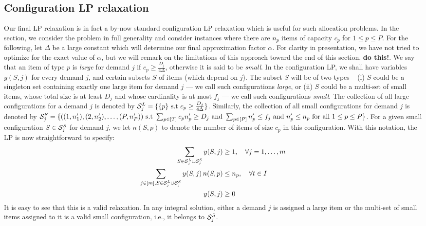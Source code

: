 \subsection{Configuration LP relaxation}
Our final LP relaxation is in fact a by-now standard configuration LP relaxation which is useful for such allocation problems. In the section, we consider the problem in full generality and consider instances where there are $n_p$ items of capacity $c_p$ for $1 \leq p \leq P$. For the following, let $\Delta$ be a large constant which will determine our final approximation factor $\alpha$. For clarity in presentation, we have not tried to optimize for the exact value of $\alpha$, but we will remark on the limitations of this approach toward the end of this section. {\bf do this!}. We say that an item of type $p$ is {\em large} for demand $j$ if $c_p \geq \frac{D_j}{4\Delta}$, otherwise it is said to be \emph{small}. In the configuration LP, we shall have variables $y(S,j)$ for every demand $j$, and certain subsets $S$ of items (which depend on $j$).
The subset $S$ will be of two types -- (i) $S$ could be a singleton set containing exactly one large item for demand $j$ --- we call such configurations {\em large}, or (ii) $S$ could be a multi-set of small items, whose total size is at least $D_j$ and whose cardinality is at most $f_j$ --- we call such configurations {\em small}. The collection of all large configurations for a demand $j$ is denoted by ${\cal S}^L_j = \{ \{p\} \text{ s.t } c_p \geq \frac{D_j}{4 \Delta}  \}$. Similarly, the collection of all small configurations for demand $j$ is denoted by ${\cal S}^S_j = \{ ((1,n'_1), (2,n'_2), \ldots, (P,n'_P)) \text{ s.t } \sum_{p \in [T]} c_p n'_p \geq D_j \text{ and } \sum_{p \in [P]} n'_p \leq f_j \text{ and } n'_p \leq n_p \text{ for all } 1 \leq p \leq P \}$. For a given small configuration $S \in {\cal S}^S_j$ for demand $j$, we let $n(S,p)$ to denote the number of items of size $c_p$ in this configuration. With this notation, the LP is now straightforward to specify:
\begin{align}
\label{eq:config1}
\sum_{S \in {\cal S}^L_j \cup {\cal S}^S_j} y(S,j) & \geq 1, \ \ \ \forall j=1, \ldots, m \\
\label{eq:config2}
\sum_{j \in [m], S \in {\cal S}^L_j \cup {\cal S}^S_j} y(S,j) \, n(S,p) & \leq n_p, \ \ \ \forall t  \in I \\
\notag
y({S,j}) & \geq 0
\end{align}
It is easy to see that this is a valid relaxation. In any integral solution, either a demand $j$ is assigned a large item or the multi-set of small items assigned to it is a valid small configuration, i.e., it belongs to ${\cal S}^S_j$.

